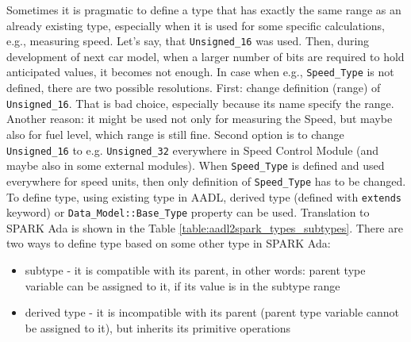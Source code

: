 Sometimes it is pragmatic to define a type that has exactly the same range as an already existing type, especially when it is used for some specific calculations, e.g., measuring speed. Let's say, that \lstinline{Unsigned_16} was used. Then, during development of next car model, when a larger number of bits are required to hold anticipated values, it becomes not enough. In case when e.g., \lstinline{Speed_Type} is not defined, there are two possible resolutions. First: change definition (range) of \lstinline{Unsigned_16}. That is bad choice, especially because its name specify the range. Another reason: it might be used not only for measuring the Speed, but maybe also for fuel level, which range is still fine. Second option is to change \lstinline{Unsigned_16} to e.g. \lstinline{Unsigned_32} everywhere in Speed Control Module (and maybe also in some external modules). When \lstinline{Speed_Type} is defined and used everywhere for speed units, then only definition of \lstinline{Speed_Type} has to be changed. To define type, using existing type in AADL, derived type (defined with \lstinline{extends} keyword) or \lstinline{Data_Model::Base_Type} property can be used. Translation to SPARK Ada is shown in the Table \ref{table:aadl2spark_types_subtypes}. There are two ways to define type based on some other type in SPARK Ada:

\begin{itemize}
	\item subtype - it is compatible with its parent, in other words: parent type variable can be assigned to it, if its value is in the subtype range
	\item derived type - it is incompatible with its parent (parent type variable cannot be assigned to it), but inherits its primitive operations
\end{itemize}

